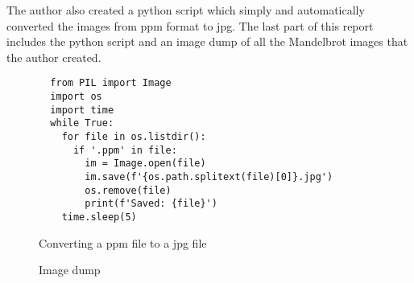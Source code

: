 \documentclass[a4paper,11pt]{article}
\begin{document}
The author also created a python script which simply and automatically converted the images from ppm format to jpg. The last part of this report includes the python script and an image dump of all the Mandelbrot images that the author created.

\begin{figure}[H]
\begin{verbatim}
  from PIL import Image
  import os
  import time
  while True:
    for file in os.listdir():
      if '.ppm' in file:
        im = Image.open(file)
        im.save(f'{os.path.splitext(file)[0]}.jpg')
        os.remove(file)
        print(f'Saved: {file}')
    time.sleep(5)
\end{verbatim}
\caption{Converting a ppm file to a jpg file}
\label{Figure:6}
\end{figure}

\begin{figure}[h]
\centering
{}%
\qquad
{}%
\qquad
{}%
\qquad
{}%
\qquad
{}%
\caption{Image dump}
\label{Figure:7}
\end{figure}
\end{document}

